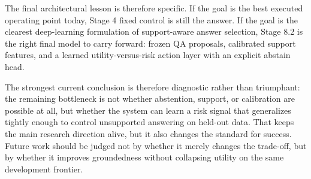 \documentclass[10pt,twocolumn]{article}
\begin{document}
The final architectural lesson is therefore specific.
If the goal is the best executed operating point today, Stage 4 fixed control
is still the answer.
If the goal is the clearest deep-learning formulation of support-aware answer
selection, Stage 8.2 is the right final model to carry forward:
frozen QA proposals, calibrated support features, and a learned
utility-versus-risk action layer with an explicit abstain head.

The strongest current conclusion is therefore diagnostic rather than triumphant:
the remaining bottleneck is not whether abstention, support, or calibration are
possible at all, but whether the system can learn a risk signal that
generalizes tightly enough to control unsupported answering on held-out data.
That keeps the main research direction alive, but it also changes the standard
for success.
Future work should be judged not by whether it merely changes the trade-off,
but by whether it improves groundedness without collapsing utility on the same
development frontier.

\begingroup
\small


\endgroup
\end{document}
